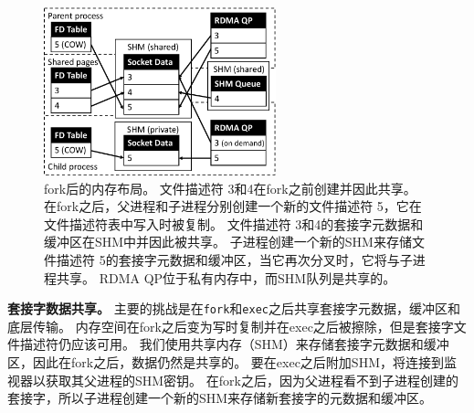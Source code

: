 \begin{figure}[htbp]
	\centering
	\includegraphics[width=0.6\textwidth]{images/fork_memory}
	
	\caption{fork后的内存布局。 文件描述符 3和4在fork之前创建并因此共享。 在fork之后，父进程和子进程分别创建一个新的文件描述符 5，它在文件描述符表中写入时被复制。 文件描述符 3和4的套接字元数据和缓冲区在SHM中并因此被共享。 子进程创建一个新的SHM来存储文件描述符 5的套接字元数据和缓冲区，当它再次分叉时，它将与子进程共享。 RDMA QP位于私有内存中，而SHM队列是共享的。}
	\label{socksdirect:fig:fork-memory}
\end{figure}
\textbf {套接字数据共享。}
主要的挑战是在\texttt {fork}和\texttt {exec}之后共享套接字元数据，缓冲区和底层传输。
内存空间在fork之后变为写时复制并在exec之后被擦除，但是套接字文件描述符仍应该可用。
我们使用共享内存（SHM）来存储套接字元数据和缓冲区，因此在fork之后，数据仍然是共享的。
要在exec之后附加SHM，\libipc {}将连接到监视器以获取其父进程的SHM密钥。
在fork之后，因为父进程看不到子进程创建的套接字，所以子进程创建一个新的SHM来存储新套接字的元数据和缓冲区。

